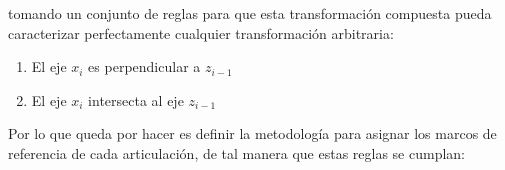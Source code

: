 \begin{multicols*}{3}
            tomando un conjunto de reglas para que esta transformación compuesta pueda caracterizar perfectamente cualquier transformación arbitraria:

            \begin{enumerate}
                \item El eje $x_i$ es perpendicular a $z_{i-1}$
                \item El eje $x_i$ intersecta al eje $z_{i-1}$
            \end{enumerate}

            \begin{center}
            \end{center}

            Por lo que queda por hacer es definir la metodología para asignar los marcos de referencia de cada articulación, de tal manera que estas reglas se cumplan:


\end{multicols*}
